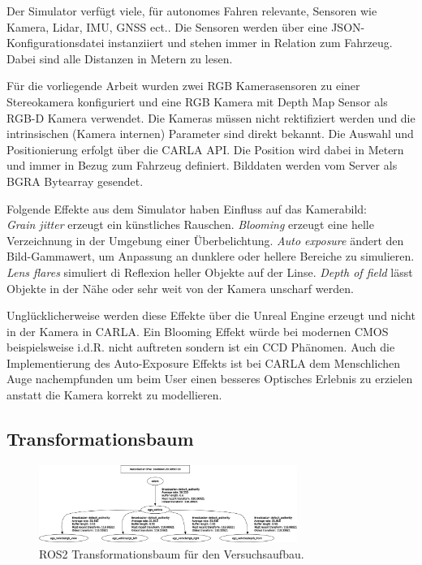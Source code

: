 Der Simulator verfügt viele, für autonomes Fahren relevante, Sensoren wie Kamera, Lidar, IMU, GNSS ect.. Die Sensoren werden über eine JSON-Konfigurationsdatei instanziiert und stehen immer in Relation zum Fahrzeug. Dabei sind alle Distanzen in Metern zu lesen.
\newline

Für die vorliegende Arbeit wurden zwei RGB Kamerasensoren zu einer Stereokamera konfiguriert und eine RGB Kamera mit Depth Map Sensor als RGB-D Kamera verwendet. Die Kameras müssen nicht rektifiziert werden und die intrinsischen (Kamera internen) Parameter sind direkt bekannt. Die Auswahl und Positionierung erfolgt über die CARLA API. Die Position wird dabei in Metern und immer in Bezug zum Fahrzeug definiert. Bilddaten werden vom Server als BGRA Bytearray gesendet.

Folgende Effekte aus dem Simulator haben Einfluss auf das Kamerabild:\\
\newline
\textit{Grain jitter} erzeugt ein künstliches Rauschen. \textit{Blooming} erzeugt eine helle Verzeichnung in der Umgebung einer Überbelichtung. \textit{Auto exposure} ändert den Bild-Gammawert, um Anpassung an dunklere oder hellere Bereiche zu simulieren. \textit{Lens flares} simuliert di Reflexion heller Objekte auf der Linse. \textit{Depth of field} lässt Objekte in der Nähe oder sehr weit von der Kamera unscharf werden. \newline


Unglücklicherweise werden diese Effekte über die Unreal Engine erzeugt und nicht in der Kamera in CARLA. Ein Blooming Effekt würde bei modernen CMOS beispielsweise i.d.R. nicht auftreten sondern ist ein CCD Phänomen. Auch die Implementierung des Auto-Exposure Effekts ist bei CARLA dem Menschlichen Auge nachempfunden um beim User einen besseres Optisches Erlebnis zu erzielen anstatt die Kamera korrekt zu modellieren.\newline


\subsection{Transformationsbaum}

\begin{figure}[h!]
  \centering
    \includegraphics[width=0.75\textwidth]{pictures/05_tf_frames.png}
    \caption[ROS2 Transformationsbaum für Visuelle Odometrie]{ROS2 Transformationsbaum für den Versuchsaufbau.}
		\label{fig:tf}
\end{figure}


